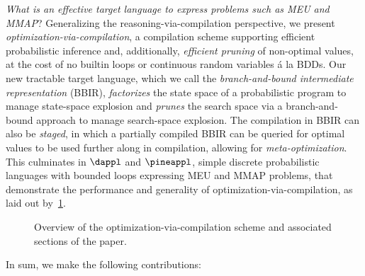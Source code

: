 \textit{What is an effective target language to express problems such as MEU and MMAP}?
Generalizing the reasoning-via-compilation perspective,
we present \textit{optimization-via-compilation}, a compilation scheme
supporting efficient probabilistic inference and, additionally, \textit{efficient pruning} of non-optimal values,
at the cost of no builtin loops or continuous random variables \'a la BDDs.
Our new tractable target language, which we call the \emph{branch-and-bound
intermediate representation} (BBIR),
\textit{factorizes} the state space of a probabilistic program to manage state-space explosion
and \textit{prunes} the search space
via a branch-and-bound approach to manage search-space explosion.
The compilation in BBIR can also be \textit{staged}, in which a partially compiled BBIR can
be queried for optimal values to be used further along in compilation, allowing for
\textit{meta-optimization}.
This culminates in $\dappl$ and $\pineappl$,
simple discrete probabilistic languages with bounded loops
expressing MEU and MMAP problems,
that demonstrate the performance and generality of optimization-via-compilation, as laid out by~\cref{fig:bb-overview}.
\begin{figure}
  \centering
  \caption{Overview of the optimization-via-compilation scheme and associated sections of the paper. }
  \label{fig:bb-overview}
\end{figure}
In sum, we make the following contributions:
